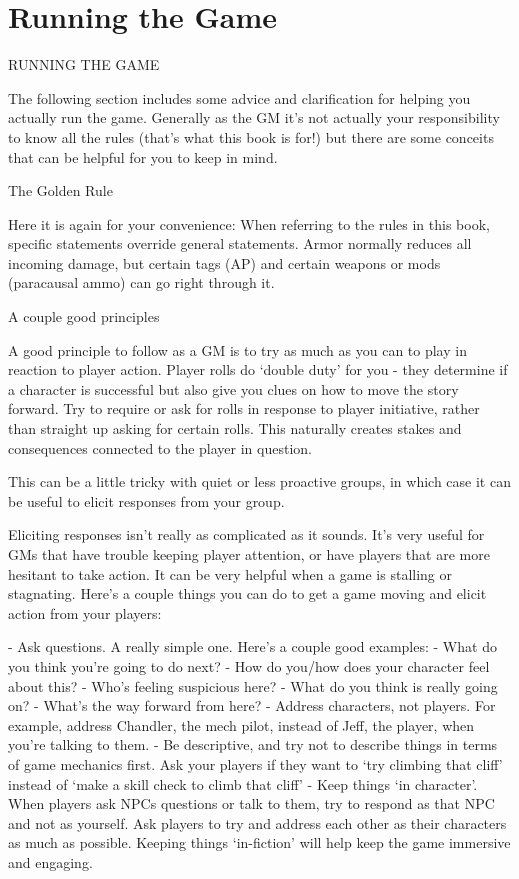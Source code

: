 \section{Running the Game}
RUNNING THE GAME

The following section includes some advice and clarification for helping you actually run the
game. Generally as the GM it’s not actually your responsibility to know all the rules (that’s what
this book is for!) but there are some conceits that can be helpful for you to keep in mind.


                                            The Golden Rule

Here it is again for your convenience: When referring to the rules in this book, specific
statements override general statements. Armor normally reduces all incoming damage, but
certain tags (AP) and certain weapons or mods (paracausal ammo) can go right through it.


                                       A couple good principles

A good principle to follow as a GM is to try as much as you can to play in reaction to player
action. Player rolls do ‘double duty’ for you - they determine if a character is successful but also
give you clues on how to move the story forward. Try to require or ask for rolls in response to
player initiative, rather than straight up asking for certain rolls. This naturally creates stakes and
consequences connected to the player in question.


This can be a little tricky with quiet or less proactive groups, in which case it can be useful to
elicit responses from your group.


Eliciting responses isn’t really as complicated as it sounds. It’s very useful for GMs that have
trouble keeping player attention, or have players that are more hesitant to take action. It can be
very helpful when a game is stalling or stagnating. Here’s a couple things you can do to get a
game moving and elicit action from your players:

            -   Ask questions. A really simple one. Here’s a couple good examples:
                     -   What do you think you’re going to do next?
                     -   How do you/how does your character feel about this?
                     -   Who’s feeling suspicious here?
                     -   What do you think is really going on?
                     -   What’s the way forward from here?
            -   Address characters, not players. For example, address Chandler, the mech
                 pilot, instead of Jeff, the player, when you’re talking to them.
            -    Be descriptive, and try not to describe things in terms of game mechanics first.
                Ask your players if they want to ‘try climbing that cliff’ instead of ‘make a skill
                check to climb that cliff’
            -    Keep things ‘in character’. When players ask NPCs questions or talk to them, try
                to respond as that NPC and not as yourself. Ask players to try and address each
                other as their characters as much as possible. Keeping things ‘in-fiction’ will help
                 keep the game immersive and engaging.



